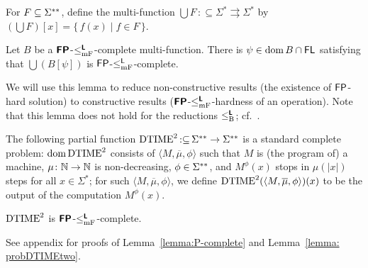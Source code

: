 \documentclass[envcountsect,envcountsame,orivec,oribibl]{llncs}
\newcommand{\pcolon}{\mathpunct{\,:\subseteq}}
\begin{document}
For $F \subseteq \Sigma ^{**}$, 
define the multi-function $\bigcup F \pcolon \Sigma ^* \rightrightarrows \Sigma ^*$ by
$(\bigcup F) [x] = \{\, f(x) \mid f \in F \,\}$.

\begin{lemma}
\label{lemma:P-complete}
Let $B$ be a $\text{\bfseries \sffamily \upshape FP}$-$\leq _{\mathrm{mF}} ^{\text{\bfseries \sffamily \upshape L}}$-complete multi-function.
There is $\psi \in \mathop{\rm dom} B \cap \mathsf{FL}$ satisfying that
 $\bigcup (B[\psi])$ is $\mathsf{FP}$-$\le^{\mathsf{L}}_{\mathrm{mF}}$-complete.
\end{lemma}

We will use this lemma to reduce 
non-constructive results (the existence of $\mathsf{FP}$-hard solution) to
constructive results ($\text{\bfseries \sffamily \upshape FP}$-$\leq _{\mathrm{mF}} ^{\text{\bfseries \sffamily \upshape L}}$-hardness of an operation).
Note that this lemma does not hold for
the reductions $\leq _{\mathrm B} ^{\text{\bfseries \sffamily \upshape L}}$; cf.~\cite[Lemma~3.6]{kawamura2012complexity}.

The following partial function $\probDTIMEtwo \pcolon \LM \to \LM$ 
is a standard complete problem: 
$\mathop{\rm dom} \mathrm{DTIME}^2$ consists of $\langle M, \overline \mu, \phi \rangle$
such that $M$ is (the program of) a machine, 
$\mu \colon \mathbb N \to \mathbb N$ is non-decreasing, 
$\phi \in \Sigma ^{**}$, 
and $M^\phi(x)$ stops in $\mu(|x|)$ steps for all $x \in \Sigma^*$; 
for such $\langle M, \overline \mu, \phi \rangle$, 
we define $\mathrm{DTIME}^2(\langle M, \overline \mu, \phi \rangle)(x)$ to be 
the output of the computation $M^\phi(x)$.

\begin{lemma}
\label{lemma: probDTIMEtwo}
 $\mathrm{DTIME}^2$ is $\text{\bfseries \sffamily \upshape FP}$-$\leq _{\mathrm{mF}} ^{\text{\bfseries \sffamily \upshape L}}$-complete.
\end{lemma}




See appendix for 
proofs of Lemma~\ref{lemma:P-complete} and Lemma~\ref{lemma: probDTIMEtwo}. 
\end{document}

